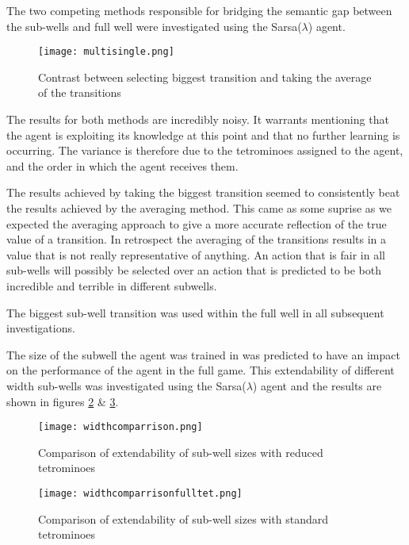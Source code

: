 \documentclass{rucsthesis}
\begin{document}
The two competing methods responsible for bridging the semantic gap between the sub-wells and full well were investigated using the Sarsa($\lambda$) agent.

\begin{figure}[h]
\centering
\texttt{[image: multisingle.png]}
\caption{Contrast between selecting biggest transition and taking the average of the transitions}
\label{fig:multisingle}
\end{figure}

The results for both methods are incredibly noisy. It warrants mentioning that the agent is exploiting its knowledge at this point and that no further learning is occurring. The variance is therefore due to the tetrominoes assigned to the agent, and the order in which the agent receives them.

The results achieved by taking the biggest transition seemed to consistently beat the results achieved by the averaging method. This came as some suprise as we expected the averaging approach to give a more accurate reflection of the true value of a transition. In retrospect the averaging of the transitions results in a value that is not really representative of anything. An action that is fair in all sub-wells will possibly be selected over an action that is predicted to be both incredible and terrible in different subwells.

The biggest sub-well transition was used within the full well in all subsequent investigations. 

The size of the subwell the agent was trained in was predicted to have an impact on the performance of the agent in the full game. This extendability of different width sub-wells was investigated using the Sarsa($\lambda$) agent and the results are shown in figures \ref{fig:widthcomparrison} \& \ref{fig:widthcomparrisonfulltet}.

\begin{figure}[h]
\centering
\texttt{[image: widthcomparrison.png]}
\caption{Comparison of extendability of sub-well sizes with reduced tetrominoes}
\label{fig:widthcomparrison}
\end{figure}

\begin{figure}[h]
\centering
\texttt{[image: widthcomparrisonfulltet.png]}
\caption{Comparison of extendability of sub-well sizes with standard tetrominoes}
\label{fig:widthcomparrisonfulltet}
\end{figure}
\end{document}
